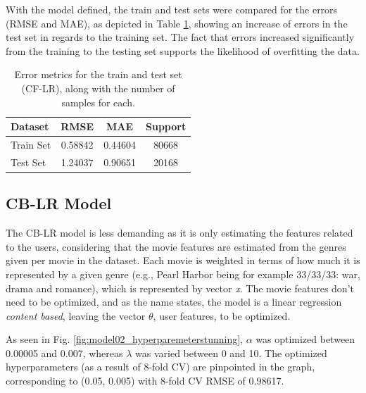 \documentclass[conference]{IEEEtran}
\begin{document}
With the model defined, the train and test sets were compared for the errors (RMSE and MAE), as depicted in Table \ref{tab:model01_results}, showing an increase of errors in the test set in regards to the training set. The fact that errors increased significantly from the training to the testing set supports the likelihood of overfitting the data.

\begin{table}[H]
\centering
\caption{Error metrics for the train and test set (CF-LR), along with the number of samples for each.}
\label{tab:model01_results}
\begin{tabular}{lccc}
\toprule
\textbf{Dataset} & \textbf{RMSE} & \textbf{MAE} & \textbf{Support} \\
\midrule
Train Set & 0.58842 & 0.44604 & 80668 \\
Test Set & 1.24037 & 0.90651 & 20168 \\
\bottomrule
\end{tabular}
\end{table}

\subsection{CB-LR Model}

The CB-LR model is less demanding as it is only estimating the features related to the users, considering that the movie features are estimated from the genres given per movie in the dataset. Each movie is weighted in terms of how much it is represented by a given genre (e.g., Pearl Harbor being for example 33/33/33: war, drama and romance), which is represented by vector \textit{x}. The movie features don't need to be optimized, and as the name states, the model is a linear regression \textit{content based}, leaving the vector \textit{$\theta$}, user features, to be optimized. 

As seen in Fig. \ref{fig:model02_hyperparemeterstunning}, $\alpha$ was optimized between 0.00005 and 0.007, whereas $\lambda$ was varied between 0 and 10. The optimized hyperparameters (as a result of 8-fold CV) are pinpointed in the graph, corresponding to (0.05, 0.005) with 8-fold CV RMSE of 0.98617.
\end{document}
